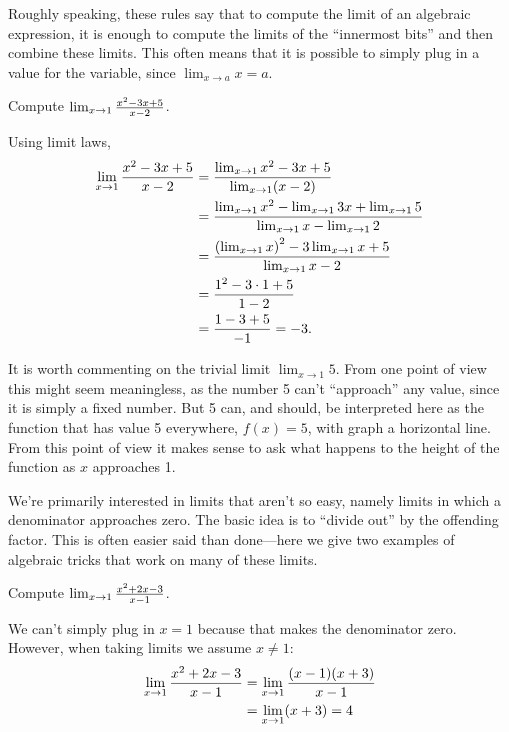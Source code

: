 Roughly speaking, these rules say that to compute the limit of an
algebraic expression, it is enough to compute the limits of the
``innermost bits'' and then combine these limits. This often means
that it is possible to simply plug in a value for the variable, since
$\lim_{x\to a} x =a$.


\begin{example}
Compute $\lim_{x\to 1}{x^2-3x+5\over x-2}$. 
\end{example}
\begin{solution}
Using limit laws, 
\begin{align*}
\lim_{x\to 1}{x^2-3x+5\over x-2}&=
\dfrac{\lim_{x\to 1}x^2-3x+5}{\lim_{x\to1}(x-2)} \\
&=\frac{\lim_{x\to 1}x^2-\lim_{x\to1}3x+\lim_{x\to1}5}{\lim_{x\to1}x-\lim_{x\to1}2} \\
&=\dfrac{\left(\lim_{x\to 1}x\right)^2-3\lim_{x\to1}x+5}{\lim_{x\to1}x-2} \\
&=\dfrac{1^2-3\cdot1+5}{1-2} \\
&=\dfrac{1-3+5}{-1} = -3.
\end{align*}
\end{solution}


It is worth commenting on the trivial limit $\lim_{x\to1}5$. From one
point of view this might seem meaningless, as the number 5 can't
``approach'' any value, since it is simply a fixed number. But 5 can,
and should, be interpreted here as the function that has value 5
everywhere, $f(x)=5$, with graph a horizontal line. From this point of
view it makes sense to ask what happens to the height of the function
as $x$ approaches 1.

We're primarily interested in limits that aren't so easy, namely
limits in which a denominator approaches zero. The basic idea is to
``divide out'' by the offending factor. This is often easier said than
done---here we give two examples of algebraic tricks that work on many
of these limits.


\begin{example}
Compute $\lim_{x\to1}{x^2+2x-3\over x-1}$. 
\end{example}
\begin{solution}
We can't simply plug in $x=1$ because that makes the denominator zero.
However, when taking limits we assume $x\ne 1$:
\begin{align*}
\lim_{x\to1}{x^2+2x-3\over x-1}&=\lim_{x\to1}{(x-1)(x+3)\over x-1} \\
&=\lim_{x\to1}(x+3)=4
\end{align*}
\end{solution}

